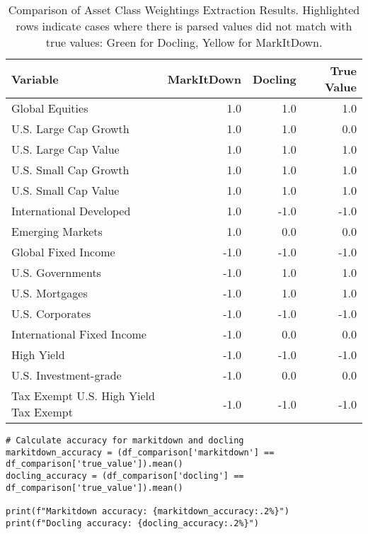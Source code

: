 \begin{table*}[h!]
\centering
\begin{tabular}{lrrr}
\toprule
\textbf{Variable} & \textbf{MarkItDown} & \textbf{Docling} & \textbf{True Value} \\
\midrule
Global Equities & 1.0 & 1.0 & 1.0 \\
\rowcolor{lightgreen} U.S. Large Cap Growth & 1.0 & 1.0 & 0.0 \\ %
U.S. Large Cap Value & 1.0 & 1.0 & 1.0 \\
U.S. Small Cap Growth & 1.0 & 1.0 & 1.0 \\
U.S. Small Cap Value & 1.0 & 1.0 & 1.0 \\
\rowcolor{lightyellow} International Developed & 1.0 & -1.0 & -1.0 \\
\rowcolor{lightyellow} Emerging Markets & 1.0 & 0.0 & 0.0 \\
Global Fixed Income & -1.0 & -1.0 & -1.0 \\
\rowcolor{lightyellow} U.S. Governments & -1.0 & 1.0 & 1.0 \\ %
\rowcolor{lightyellow} U.S. Mortgages & -1.0 & 1.0 & 1.0 \\ %
U.S. Corporates & -1.0 & -1.0 & -1.0 \\
\rowcolor{lightyellow} International Fixed Income & -1.0 & 0.0 & 0.0 \\
High Yield & -1.0 & -1.0 & -1.0 \\
\rowcolor{lightyellow} U.S. Investment-grade & -1.0 & 0.0 & 0.0 \\
Tax Exempt U.S. High Yield Tax Exempt & -1.0 & -1.0 & -1.0 \\
\bottomrule
\end{tabular}
\caption{Comparison of Asset Class Weightings Extraction Results. Highlighted rows indicate cases where there is parsed values did not match with true values: Green for Docling, Yellow for MarkItDown.}
\label{tab:asset-class-comparison}
\end{table*}


\begin{verbatim}
# Calculate accuracy for markitdown and docling
markitdown_accuracy = (df_comparison['markitdown'] == df_comparison['true_value']).mean()
docling_accuracy = (df_comparison['docling'] == df_comparison['true_value']).mean()

print(f"Markitdown accuracy: {markitdown_accuracy:.2%}")
print(f"Docling accuracy: {docling_accuracy:.2%}") 
\end{verbatim}


